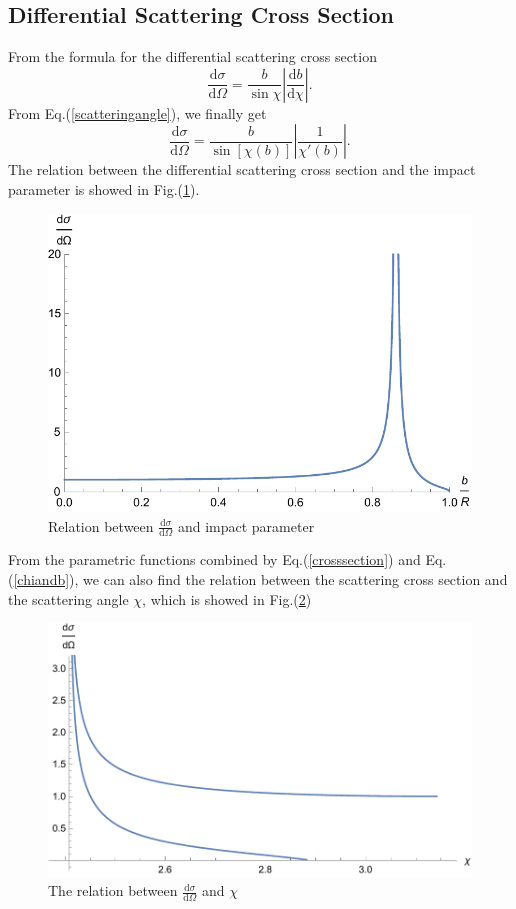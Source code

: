 \documentclass[%
 reprint,
 amsmath,amssymb,
 aps,
]{revtex4-1}
\begin{document}
\subsection{Differential Scattering Cross Section}
From the formula for the differential scattering cross section
\begin{equation}
    \frac{\mathrm{d}\sigma}{\mathrm{d}\Omega}=\frac{b}{\sin{\chi}}|\frac{\mathrm{d}b}{\mathrm{d}\chi}|.
\end{equation}
From Eq.(\ref{scatteringangle}), we finally get
\begin{equation}
    \frac{\mathrm{d}\sigma}{\mathrm{d}\Omega}=\frac{b}{\sin{[\chi(b)]}}\left|\frac{1}{\chi'(b)}\right|.
\label{crosssection}
\end{equation}
The relation between the differential scattering cross section and the impact parameter is showed in Fig.(\ref{diffcrosssection}).
\begin{figure}
    \centering
    \includegraphics[scale=0.6]{diffcrosssecctionofb.pdf}
    \caption{Relation between $\frac{\mathrm{d}\sigma}{\mathrm{d}\Omega}$ and impact parameter}
    \label{diffcrosssection}
\end{figure}
From the parametric functions combined by Eq.(\ref{crosssection}) and Eq.(\ref{chiandb}), we can also find the relation between the scattering cross section and the scattering angle $\chi$, which is showed in Fig.(\ref{crosssectionofchi})
\begin{figure}
    \centering
    \includegraphics[scale=0.5]{crosssectionofchi.pdf}
    \caption{The relation between $\frac{\mathrm{d}\sigma}{\mathrm{d}\Omega}$ and $\chi$}
    \label{crosssectionofchi}
\end{figure}
\end{document}
